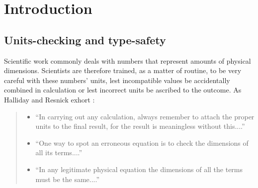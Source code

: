 
\begin{quotation} \tableofcontents \end{quotation}

\newpage \setcounter{page}{1}




\section{ Introduction }

\subsection{ Units-checking and type-safety }

Scientific work commonly deals with numbers
that represent amounts of physical dimensions.
Scientists are therefore trained,
as a matter of routine,
to be very careful with these numbers' units,
lest incompatible values be accidentally combined in calculation
or lest incorrect units be ascribed to the outcome.
As Halliday and Resnick exhort \cite[pp. 35-6]{Halliday}:
\begin{quote}
\begin{itemize}
  \item
    ``In carrying out any calculation,
    always remember to attach the proper units to the final result,
    for the result is meaningless without this....''
  \item
    ``One way to spot an erroneous equation
    is to check the dimensions of all its terms....''
  \item
    ``In any legitimate physical equation
    the dimensions of all the terms must be the same....''
\end{itemize}
\end{quote}

